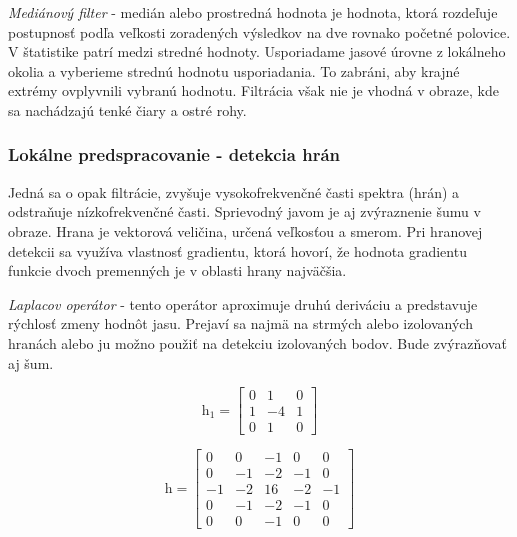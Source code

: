 \textit{Mediánový filter} - medián alebo prostredná hodnota je hodnota, ktorá rozdeľuje postupnosť podľa veľkosti zoradených výsledkov na dve rovnako početné polovice. V štatistike patrí medzi stredné hodnoty. Usporiadame jasové úrovne z lokálneho okolia a vyberieme strednú hodnotu usporiadania. To zabráni, aby krajné extrémy ovplyvnili vybranú hodnotu. Filtrácia však nie je vhodná v obraze, kde sa nachádzajú tenké čiary a ostré rohy. \cite{Detekcia_a_rozpoznavanie_objektov} 


\subsubsection{Lokálne predspracovanie - detekcia hrán}
\label{sec:edge}
Jedná sa o opak filtrácie, zvyšuje vysokofrekvenčné časti spektra (hrán) a odstraňuje nízkofrekvenčné časti. Sprievodný javom je aj zvýraznenie šumu v obraze. Hrana je vektorová veličina, určená veľkosťou a smerom. Pri hranovej detekcii sa využíva vlastnosť gradientu, ktorá hovorí, že hodnota gradientu funkcie dvoch premenných je v oblasti hrany najväčšia. \cite{Learning_openCV}
\vspace{5mm}


\textit{Laplacov operátor} - tento operátor aproximuje druhú deriváciu a predstavuje rýchlosť zmeny hodnôt jasu. Prejaví sa najmä na strmých alebo izolovaných hranách alebo ju možno použiť na detekciu izolovaných bodov. Bude zvýrazňovať aj šum. \cite{Detekcia_a_rozpoznavanie_objektov}\cite{Learning_openCV}

\vspace{5mm}

\begin{figure}[H]
    \centering
    \begin{minipage}[b]{0.49\textwidth}
        \begin{equation}
            \textit{h}_1=\begin{bmatrix} 0 & 1 & 0 \\ 1 & -4 & 1 \\ 0 & 1 & 0  \end{bmatrix}
        \end{equation}
    \end{minipage}
    \hfill
    \begin{minipage}[b]{0.49\textwidth}
        \begin{equation}
            \textit{h}=\begin{bmatrix} 0 & 0 & -1 & 0 & 0 \\ 0 & -1 & -2 & -1 & 0 \\ -1 & -2 & 16 & -2 & -1 \\ 0 & -1 & -2 & -1 & 0 \\ 0 & 0 & -1 & 0 & 0  \end{bmatrix}
        \end{equation}
    \end{minipage}
\end{figure}

